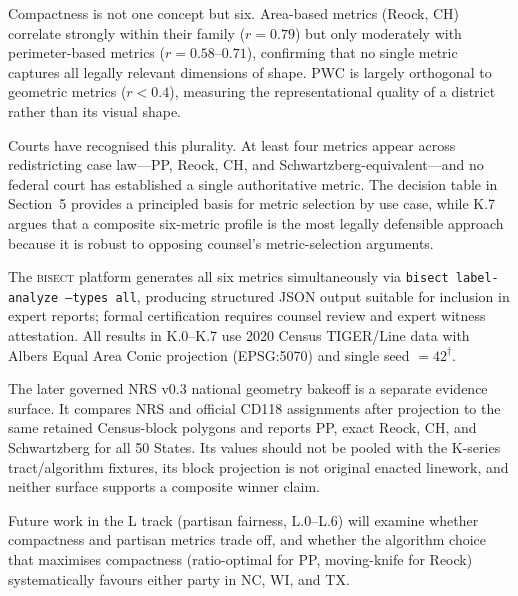 Compactness is not one concept but six. Area-based metrics (Reock, CH) correlate
strongly within their family ($r = 0.79$) but only moderately with perimeter-based
metrics ($r = 0.58$--$0.71$), confirming that no single metric captures all
legally relevant dimensions of shape. PWC is largely orthogonal to geometric metrics
($r < 0.4$), measuring the representational quality of a district rather than
its visual shape.

Courts have recognised this plurality. At least four metrics appear across
redistricting case law---PP, Reock, CH, and Schwartzberg-equivalent---and
no federal court has established a single authoritative metric.
The decision table in Section~5 provides a principled basis for metric selection
by use case, while K.7 argues that a composite six-metric profile is the most
legally defensible approach because it is robust to opposing counsel's
metric-selection arguments.

The \textsc{bisect} platform generates all six metrics simultaneously via
\texttt{bisect label-analyze --types all}, producing structured JSON output
suitable for inclusion in expert reports; formal certification requires
counsel review and expert witness attestation. All results in K.0--K.7 use 2020 Census TIGER/Line data
with Albers Equal Area Conic projection (EPSG:5070) and single seed $= 42^\dagger$.

The later governed NRS v0.3 national geometry bakeoff is a separate evidence
surface. It compares NRS and official CD118 assignments after projection to
the same retained Census-block polygons and reports PP, exact Reock, CH, and
Schwartzberg for all 50 States. Its values should not be pooled with the
K-series tract/algorithm fixtures, its block projection is not original
enacted linework, and neither surface supports a composite winner claim.

Future work in the L track (partisan fairness, L.0--L.6) will examine
whether compactness and partisan metrics trade off, and whether the
algorithm choice that maximises compactness (ratio-optimal for PP, moving-knife
for Reock) systematically favours either party in NC, WI, and TX.
